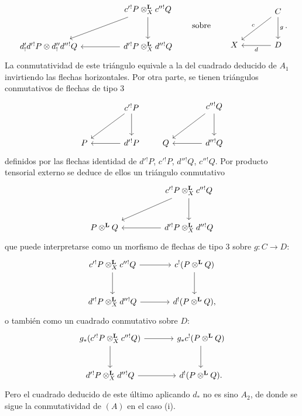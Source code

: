 \begin{prooftext}[Demostración]
\[\begin{tikzcd}[column sep=huge,row sep=large]
& c'{}^!P\otimes_X^{\mathbf L}c''{}^!Q \arrow[d] \arrow[dl]\\
d'_!d'{}^!P\otimes d''_!d''{}^!Q &
d'{}^!P\otimes_X^{\mathbf L}d''{}^!Q\arrow[l]
\end{tikzcd}
\qquad\text{sobre}\qquad
\begin{tikzcd}[column sep=large,row sep=large]
& C\arrow[d,"g"]\arrow[dl,"c"']\\
X & D\arrow[l,"d"]
\end{tikzcd}.
\]
La conmutatividad de este triángulo equivale a la del cuadrado deducido de $A_1$ invirtiendo las flechas horizontales. Por otra parte, se tienen triángulos conmutativos de flechas de tipo $3$
\[
\begin{tikzcd}[column sep=large,row sep=large]
& c'{}^!P \arrow[d]\arrow[dl]\\
P & d'{}^!P\arrow[l]
\end{tikzcd}
\qquad
\begin{tikzcd}[column sep=large,row sep=large]
& c''{}^!Q \arrow[d]\arrow[dl]\\
Q & d''{}^!Q\arrow[l]
\end{tikzcd}
\]
definidos por las flechas identidad de $d'{}^!P$, $c'{}^!P$, $d''{}^!Q$, $c''{}^!Q$. Por producto tensorial externo se deduce de ellos un triángulo conmutativo
\[
\begin{tikzcd}[column sep=huge,row sep=large]
& c'{}^!P\otimes_X^{\mathbf L}c''{}^!Q \arrow[d]\arrow[dl]\\
P\otimes^{\mathbf L}Q & d'{}^!P\otimes_X^{\mathbf L}d''{}^!Q\arrow[l]
\end{tikzcd}
\]
que puede interpretarse como un morfismo de flechas de tipo $3$ sobre $g:C\longrightarrow D$:
\[
\begin{tikzcd}[column sep=large,row sep=large]
c'{}^!P\otimes_X^{\mathbf L}c''{}^!Q \arrow[r]\arrow[d] &
c^!(P\otimes^{\mathbf L}Q)\arrow[d]\\
d'{}^!P\otimes_X^{\mathbf L}d''{}^!Q \arrow[r] &
d^!(P\otimes^{\mathbf L}Q),
\end{tikzcd}
\]
o también como un cuadrado conmutativo sobre $D$:
\[
\begin{tikzcd}[column sep=large,row sep=large]
g_*(c'{}^!P\otimes_X^{\mathbf L}c''{}^!Q) \arrow[r]\arrow[d] &
g_*c^!(P\otimes^{\mathbf L}Q)\arrow[d]\\
d'{}^!P\otimes_X^{\mathbf L}d''{}^!Q \arrow[r] &
d^!(P\otimes^{\mathbf L}Q).
\end{tikzcd}
\]
Pero el cuadrado deducido de este último aplicando $d_*$ no es sino $A_2$, de donde se sigue la conmutatividad de $(A)$ en el caso (i).


\end{prooftext}
